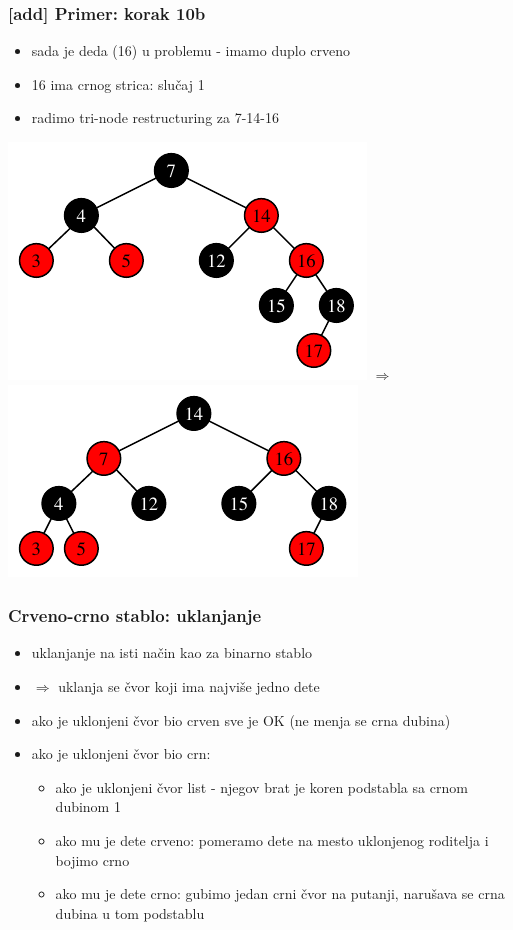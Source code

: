 \documentclass[compress,aspectratio=169]{beamer}
\begin{document}
\begin{frame}[fragile]
  \frametitle{[add] Primer: korak 10b}
  \begin{itemize}
    \item sada je deda (16) u problemu - imamo duplo crveno
    \item 16 ima crnog strica: slučaj 1
    \item radimo tri-node restructuring za 7-14-16
  \end{itemize}
  \begin{center}
    \includegraphics[scale=0.8]{asp-11-add-16.pdf} $\Rightarrow$
    \includegraphics[scale=0.8]{asp-11-add-17.pdf}
  \end{center}
\end{frame}

\begin{frame}[fragile]
  \frametitle{Crveno-crno stablo: uklanjanje}
  \begin{itemize}
    \item uklanjanje na isti način kao za binarno stablo 
    \item $\Rightarrow$ uklanja se čvor koji ima najviše jedno dete
    \item ako je uklonjeni čvor bio crven sve je OK (ne menja se crna dubina)
    \item ako je uklonjeni čvor bio crn:
    \begin{itemize}
      \item ako je uklonjeni čvor list - njegov brat je koren podstabla sa crnom dubinom 1
      \item ako mu je dete crveno: pomeramo dete na mesto uklonjenog roditelja i bojimo crno
      \item ako mu je dete crno: gubimo jedan crni čvor na putanji, narušava se crna dubina u tom podstablu
    \end{itemize}
  \end{itemize}
\end{frame}
\end{document}
